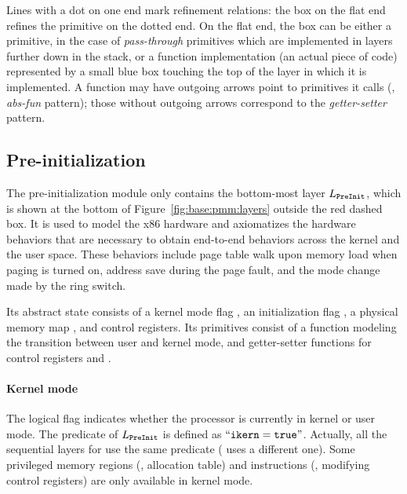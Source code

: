 Lines with a dot on one end mark refinement relations: the box on the
flat end refines the primitive on the dotted end. On the flat end, the
box can be either a primitive, in the case of \emph{pass-through}
primitives which are implemented in layers further down in the stack,
or a function implementation (an actual piece of code) represented by
a small blue box touching the top of the layer in which it is
implemented.  A function may have outgoing arrows point to primitives
it calls (\ie, \emph{abs-fun} pattern); those without
outgoing arrows correspond to the \emph{getter-setter} pattern.

\subsection{Pre-initialization}
\label{sec:base:preinit}
The pre-initialization module only contains the bottom-most layer
$L_{\texttt{PreInit}}$, which is shown at the bottom of Figure~\ref{fig:base:pmm:layers} outside the red dashed box. It is used to model the x86 hardware and axiomatizes the
hardware behaviors that are necessary to obtain end-to-end behaviors
across the kernel and the user space. These behaviors include page
table walk upon memory load when paging is turned on, 
address save during the page fault,
and the mode change made by the ring switch.
Its abstract state consists of a kernel mode flag ,
an initialization flag ,
a physical memory map ,
and control registers.
Its primitives consist of
a function modeling the transition between user and kernel mode,
and 
getter-setter functions for control registers and .

\paragraph{Kernel mode} The logical flag  indicates
whether the processor is currently in kernel or user mode.
The  predicate of $L_{\texttt{PreInit}}$
is defined as $``{\texttt{ikern}} ={\texttt{true}}"$.
Actually, all the sequential layers for \mCTOS{} use the same
  predicate
 (\mCTOShyper{} uses a different one).
Some privileged
memory regions (\eg, allocation table) and 
instructions (\eg, modifying control registers)
are only available in kernel mode.




